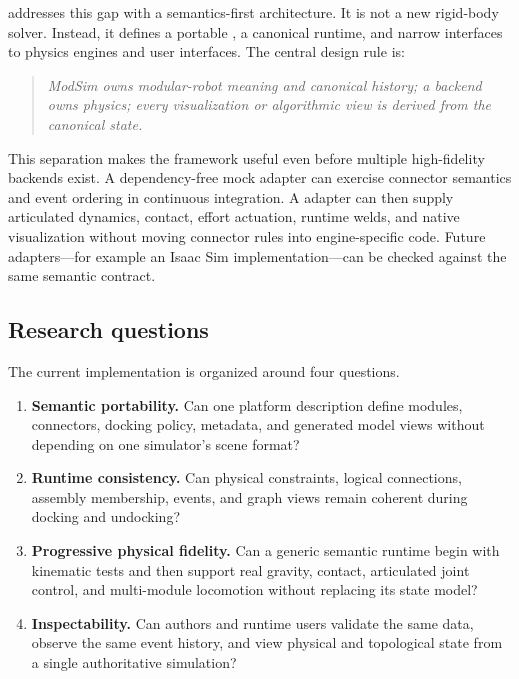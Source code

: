 \modsim{} addresses this gap with a semantics-first architecture. It is not a new
rigid-body solver. Instead, it defines a portable \robotpack{}, a canonical runtime,
and narrow interfaces to physics engines and user interfaces. The central design rule
is:

\begin{quote}
\emph{ModSim owns modular-robot meaning and canonical history; a backend owns physics;
every visualization or algorithmic view is derived from the canonical state.}
\end{quote}

This separation makes the framework useful even before multiple high-fidelity backends
exist. A dependency-free mock adapter can exercise connector semantics and event
ordering in continuous integration. A \mujoco{} adapter can then supply articulated
dynamics, contact, effort actuation, runtime welds, and native visualization without
moving connector rules into engine-specific code. Future adapters---for example an
Isaac Sim implementation---can be checked against the same semantic contract.

\subsection{Research questions}

The current implementation is organized around four questions.

\begin{enumerate}
  \item \textbf{Semantic portability.} Can one platform description define modules,
        connectors, docking policy, metadata, and generated model views without
        depending on one simulator's scene format?
  \item \textbf{Runtime consistency.} Can physical constraints, logical connections,
        assembly membership, events, and graph views remain coherent during docking
        and undocking?
  \item \textbf{Progressive physical fidelity.} Can a generic semantic runtime begin
        with kinematic tests and then support real gravity, contact, articulated joint
        control, and multi-module locomotion without replacing its state model?
  \item \textbf{Inspectability.} Can authors and runtime users validate the same data,
        observe the same event history, and view physical and topological state from a
        single authoritative simulation?
\end{enumerate}

